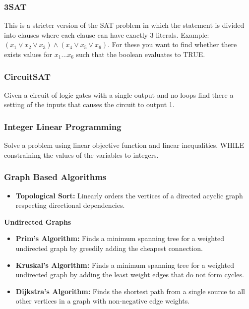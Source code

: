 \documentclass[landscape,7pt]{extarticle}
\begin{document}
\begin{multicols*}{3}
\subsubsection*{3SAT}

This is a stricter version of the SAT problem in which the statement is divided into clauses where each clause can have exactly 3 literals. Example: 
$(x_1 \vee x_2 \vee x_3) \wedge (x_4 \vee x_5 \vee x_6)$. For these you want to find whether there exists values for $x_1...x_6$ such that the boolean evaluates to TRUE.

\subsubsection*{CircuitSAT}

Given a circuit of logic gates with a single output and no loops find there a setting of the inputs that causes the circuit to output 1.

\subsubsection*{Integer Linear Programming}

Solve a problem using linear objective function and linear inequalities, WHILE constraining the values of the variables to integers.


\subsubsection*{Graph Based Algorithms}

\begin{itemize}
    \item \textbf{Topological Sort:} Linearly orders the vertices of a directed acyclic graph respecting directional dependencies.
\end{itemize}

\textbf{Undirected Graphs}

\begin{itemize}
    \item \textbf{Prim's Algorithm:} Finds a minimum spanning tree for a weighted undirected graph by greedily adding the cheapest connection.
    \item \textbf{Kruskal's Algorithm:} Finds a minimum spanning tree for a weighted undirected graph by adding the least weight edges that do not form cycles.
    \item \textbf{Dijkstra's Algorithm:} Finds the shortest path from a single source to all other vertices in a graph with non-negative edge weights.
\end{itemize}


\end{multicols*}
\end{document}
